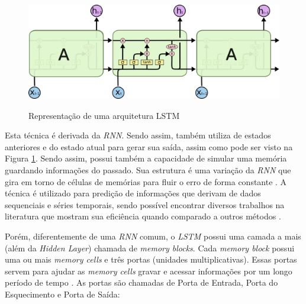\begin{figure}[htbp]
    \centering
    \includegraphics[scale=0.4]{monography/img/models/lstm3.png}
    \label{figure:lstm}
    \caption[Representação de uma arquitetura LSTM]{Representação de uma arquitetura LSTM\footnotemark}
\end{figure}

Esta técnica é derivada da \textit{\acrshort{RNN}}. Sendo assim, também utiliza de estados anteriores e do estado atual para gerar sua saída, assim como pode ser visto na Figura \ref{figure:lstm}. Sendo assim, possui também a capacidade de simular uma memória guardando informações do passado. Sua estrutura é uma variação da \textit{\acrshort{RNN}} que gira em torno de células de memórias para fluir o erro de forma constante \cite{doi:10.1162/neco.1997.9.8.1735}. A técnica é utilizado para predição de informações que derivam de dados sequenciais e séries temporais, sendo possível encontrar diversos trabalhos na literatura que mostram sua eficiência quando comparado a outros métodos \cite{alex2012}.

Porém, diferentemente de uma \textit{\acrshort{RNN}} comum, o \textit{\acrshort{LSTM}} possui uma camada a mais (além da \textit{Hidden Layer}) chamada de \textit{memory blocks}. Cada \textit{memory block} possui uma ou mais \textit{memory cells} e três portas (unidades multiplicativas). Essas portas servem para ajudar as \textit{memory cells} gravar e acessar informações por um longo período de tempo \cite{alex2012}. As portas são chamadas de Porta de Entrada, Porta do Esquecimento e Porta de Saída:


